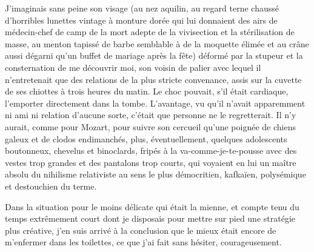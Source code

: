 J’imaginais sans peine son visage (au nez aquilin, au regard terne chaussé d’horribles lunettes vintage à monture dorée qui lui donnaient des airs de médecin-chef de camp de la mort adepte de la vivisection et la stérilisation de masse, au menton tapissé de barbe semblable à de la moquette élimée et au crâne aussi dégarni qu’un buffet de mariage après la fête) déformé par la stupeur et la consternation de me découvrir moi, son voisin de palier avec lequel il n’entretenait que des relations de la plus stricte convenance, assis sur la cuvette de ses chiottes à trois heures du matin. Le choc pouvait, s’il était cardiaque, l’emporter directement dans la tombe. L’avantage, vu qu’il n’avait apparemment ni ami ni relation d’aucune sorte, c’était que personne ne le regretterait. Il n’y aurait, comme pour Mozart, pour suivre son cercueil qu’une poignée de chiens galeux et de clodos endimanchés, plus, éventuellement, quelques adolescents boutonneux, chevelus et binoclards, fripés à la va-comme-je-te-pousse avec des vestes trop grandes et des pantalons trop courts, qui voyaient en lui un maître absolu du nihilisme relativiste au sens le plus démocritien, kafkaïen, polysémique et destouchien du terme.

Dans la situation pour le moins délicate qui était la mienne, et compte tenu du temps extrêmement court dont je disposais pour mettre sur pied une stratégie plus créative, j’en suis arrivé à la conclusion que le mieux était encore de m’enfermer dans les toilettes, ce que j’ai fait sans hésiter, courageusement.

%

